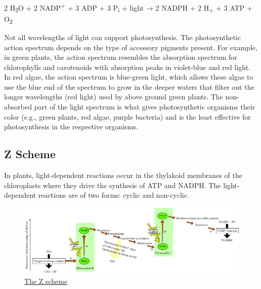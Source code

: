 2 H\textsubscript{2}O + 2 NADP\textsuperscript{+} + 3 ADP + 3 P\textsubscript{i} + light → 2 NADPH + 2 H\textsubscript{+} + 3 ATP + O\textsubscript{2}

Not all wavelengths of light can support photosynthesis. The photosynthetic action spectrum depends on the type of accessory pigments present. For example, in green plants, the action spectrum resembles the absorption spectrum for chlorophylls and carotenoids with absorption peaks in violet-blue and red light. In red algae, the action spectrum is blue-green light, which allows these algae to use the blue end of the spectrum to grow in the deeper waters that filter out the longer wavelengths (red light) used by above ground green plants. The non-absorbed part of the light spectrum is what gives photosynthetic organisms their color (e.g., green plants, red algae, purple bacteria) and is the least effective for photosynthesis in the respective organisms.

\hypertarget{z-scheme}{%
\subsection{Z Scheme}\label{z-scheme}}

In plants, light-dependent reactions occur in the thylakoid membranes of the chloroplasts where they drive the synthesis of ATP and NADPH. The light-dependent reactions are of two forms: cyclic and non-cyclic.



\begin{figure}

{\centering \includegraphics[width=0.7\linewidth]{./figures/photosynthesis/Z-scheme} 

}

\caption{\href{https://commons.wikimedia.org/wiki/File:Z-scheme.png}{The Z scheme}}\label{fig:zscheme}
\end{figure}

